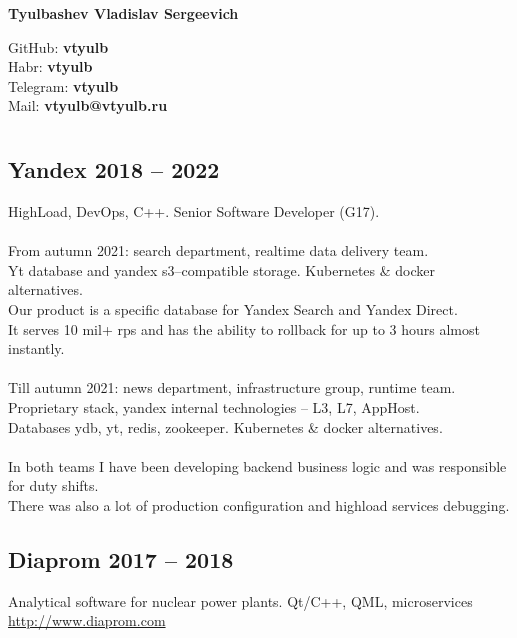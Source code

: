 \documentclass[a4paper, 11pt]{article}
\begin{document}
\begin{center}
    \huge\textbf{Tyulbashev Vladislav Sergeevich}\\
\end{center}
\null\hfill GitHub: \textbf{vtyulb} \\
\null\hfill Habr: \textbf{vtyulb} \\
\null\hfill Telegram: \textbf{vtyulb} \\
\null\hfill Mail: \textbf{vtyulb@vtyulb.ru} \\

\section*{} {
    \subsection*{Yandex 2018 -- 2022} {
        HighLoad, DevOps, C++. Senior Software Developer (G17). \\
        \\
        From autumn 2021: search department, realtime data delivery team. \\
        Yt database and yandex s3--compatible storage. Kubernetes \& docker alternatives. \\
        Our product is a specific database for Yandex Search and Yandex Direct. \\
        It serves 10 mil+ rps and has the ability to rollback for up to 3 hours almost instantly. \\
        \\
        Till autumn 2021: news department, infrastructure group, runtime team. \\
        Proprietary stack, yandex internal technologies -- L3, L7, AppHost. \\
        Databases ydb, yt, redis, zookeeper. Kubernetes \& docker alternatives. \\
        \\
        In both teams I have been developing backend business logic and was responsible for duty shifts. \\
        There was also a lot of production configuration and highload services debugging.
    }
        
    \subsection*{Diaprom 2017 -- 2018} {
        Analytical software for nuclear power plants. Qt/C++, QML, microservices \\
        \href{http://www.diaprom.com/}{http://www.diaprom.com}
    }
    
}
\end{document}
